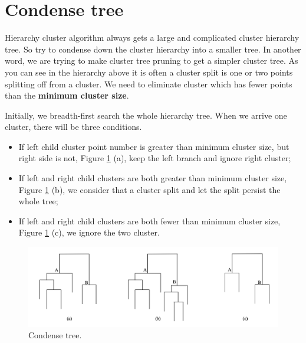 \documentclass{article}
\begin{document}
\section{Condense tree}

Hierarchy cluster algorithm always gets a large and complicated cluster hierarchy tree. So \cite{campello2013density} try to condense down the cluster hierarchy into a smaller tree. In another word, we are trying to make cluster tree pruning to get a simpler cluster tree. As you can see in the hierarchy above it is often a cluster split is one or two points splitting off from a cluster. We need to eliminate cluster which has fewer points than the \textbf{minimum cluster size}. 

Initially, we breadth-first search the whole hierarchy tree. When we arrive one cluster, there will be three conditions.

\begin{itemize}
	\item If left child cluster point number is greater than minimum cluster size, but right side is not, Figure \ref{fig:condtree} (a), keep the left branch and ignore right cluster;
	\item If left and right child clusters are both greater than minimum cluster size, Figure \ref{fig:condtree} (b), we consider that a cluster split and let the split persist the whole tree;
	\item If left and right child clusters are both fewer than minimum cluster size, Figure \ref{fig:condtree} (c), we ignore the two cluster.
\end{itemize}

\begin{figure}[h!]
	\centering
	\includegraphics[scale=0.45]{b.png}
	\caption{Condense tree.}
	\label{fig:condtree}
\end{figure}
\end{document}
